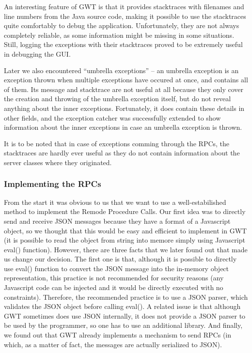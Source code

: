 An interesting feature of GWT is that it provides stacktraces with filenames and line numbers from the Java source code, making it possible to use the stacktraces quite comfortably to debug the application.
Unfortunately, they are not always completely reliable, as some information might be missing in some situations.
Still, logging the exceptions with their stacktraces proved to be extremely useful in debugging the GUI.

Later we also encountered ``umbrella exceptions'' -- an umbrella exception is an exception thrown when multiple exceptions have occured at once, and contains all of them. Its message and stacktrace are not useful at all because they only cover the creation and throwing of the umbrella exception itself, but do not reveal anything about the inner exceptions. Fortunately, it does contain these details in other fields, and the exception catcher was successfully extended to show information about the inner exceptions in case an umbrella exception is thrown.

It is to be noted that in case of exceptions comming through the RPCs, the stacktraces are hardly ever useful as they do not contain information about the server classes where they originated.

\subsubsection{Implementing the RPCs}

From the start it was obvious to us that we want to use a well-estabilished method to implement the Remode Procedure Calls. Our first idea was to directly send and receive JSON messages because they have a format of a Javascript object, so we thought that this would be easy and efficient to implement in GWT (it is possible to read the object from string into memore simply using Javascript eval() function). However, there are three facts that we later found out that made us change our decision. The first one is that, although it is possible to directly use eval() function to convert the JSON message into the in-memory object representation, this practice is not recommended for security reasons (any Javascript code can be injected and it would be directly executed with no constraints). Therefore, the recommended practice is to use a JSON parser, which validates the JSON object before calling eval(). A related issue is that although GWT sometimes does use JSON internally, it does not provide a JSON parser to be used by the programmer, so one has to use an additional library. And finally, we found out that GWT already implements a mechanism to send RPCs (in which, as a matter of fact, the messages are actually serialized to JSON).

